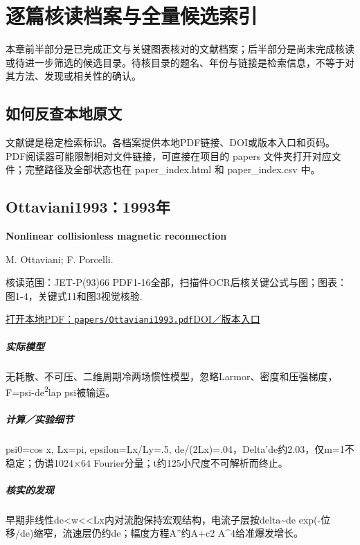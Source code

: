 \chapter{逐篇核读档案与全量候选索引}\label{ch:catalog}

本章前半部分是已完成正文与关键图表核对的文献档案；后半部分是尚未完成核读或待进一步筛选的候选目录。待核目录的题名、年份与链接是检索信息，不等于对其方法、发现或相关性的确认。

\section{如何反查本地原文}

文献键是稳定检索标识。各档案提供本地PDF链接、DOI或版本入口和页码。PDF阅读器可能限制相对文件链接，可直接在项目的 papers 文件夹打开对应文件；完整路径及全部状态也在 paper\_index.html 和 paper\_index.csv 中。

\section{Ottaviani1993：1993年}\label{paper:Ottaviani1993}

\textbf{Nonlinear collisionless magnetic reconnection}\citep{Ottaviani1993}\

M. Ottaviani;  F. Porcelli.

\textsf{核读范围：}JET-P(93)66 PDF1-16全部，扫描件OCR后核关键公式与图；\textsf{图表：}图1-4，关键式11和图3视觉核验.

\href{run:papers/Ottaviani1993.pdf}{打开本地PDF：\texttt{papers/Ottaviani1993.pdf}}\quad\href{https://doi.org/10.1103/PhysRevLett.71.3802}{DOI／版本入口}

\paragraph{实际模型}无耗散、不可压、二维周期冷两场惯性模型，忽略Larmor、密度和压强梯度，F=psi-de\textsuperscript{2}lap psi被输运。

\paragraph{计算／实验细节}psi0=cos x, Lx=pi, epsilon=Lx/Ly=.5, de/(2Lx)=.04，Delta'de约2.03，仅m=1不稳定；伪谱1024×64 Fourier分量；t约125小尺度不可解析而终止。

\paragraph{核实的发现}早期非线性de<w<<Lx内对流胞保持宏观结构，电流子层按delta\textasciitilde{}de exp(-位移/de)缩窄，流速层仍约de；幅度方程A''约A+c2 A\textasciicircum{}4给准爆发增长。

